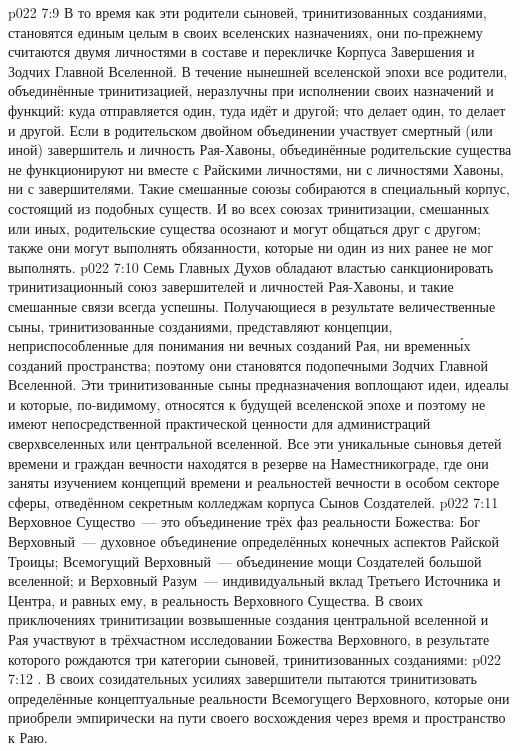 \vs p022 7:9 В то время как эти родители сыновей, тринитизованных созданиями, становятся единым целым в своих вселенских назначениях, они по\hyp{}прежнему считаются двумя личностями в составе и перекличке Корпуса Завершения и Зодчих Главной Вселенной. В течение нынешней вселенской эпохи все родители, объединённые тринитизацией, неразлучны при исполнении своих назначений и функций: куда отправляется один, туда идёт и другой; что делает один, то делает и другой. Если в родительском двойном объединении участвует смертный (или иной) завершитель и личность Рая\hyp{}Хавоны, объединённые родительские существа не функционируют ни вместе с Райскими личностями, ни с личностями Хавоны, ни с завершителями. Такие смешанные союзы собираются в специальный корпус, состоящий из подобных существ. И во всех союзах тринитизации, смешанных или иных, родительские существа осознают и могут общаться друг с другом; также они могут выполнять обязанности, которые ни один из них ранее не мог выполнять.
\vs p022 7:10 \pc Семь Главных Духов обладают властью санкционировать тринитизационный союз завершителей и личностей Рая\hyp{}Хавоны, и такие смешанные связи всегда успешны. Получающиеся в результате величественные сыны, тринитизованные созданиями, представляют концепции, неприспособленные для понимания ни вечных созданий Рая, ни временн\'ых созданий пространства; поэтому они становятся подопечными Зодчих Главной Вселенной. Эти тринитизованные сыны предназначения воплощают идеи, идеалы и  которые, по\hyp{}видимому, относятся к будущей вселенской эпохе и поэтому не имеют непосредственной практической ценности для администраций сверхвселенных или центральной вселенной. Все эти уникальные сыновья детей времени и граждан вечности находятся в резерве на Наместникограде, где они заняты изучением концепций времени и реальностей вечности в особом секторе сферы, отведённом секретным колледжам корпуса Сынов Создателей.
\vs p022 7:11 \pc Верховное Существо~--- это объединение трёх фаз реальности Божества: Бог Верховный~--- духовное объединение определённых конечных аспектов Райской Троицы; Всемогущий Верховный~--- объединение мощи Создателей большой вселенной; и Верховный Разум~--- индивидуальный вклад Третьего Источника и Центра, и равных ему, в реальность Верховного Существа. В своих приключениях тринитизации возвышенные создания центральной вселенной и Рая участвуют в трёхчастном исследовании Божества Верховного, в результате которого рождаются три категории сыновей, тринитизованных созданиями:
\vs p022 7:12 . В своих созидательных усилиях завершители пытаются тринитизовать определённые концептуальные реальности Всемогущего Верховного, которые они приобрели эмпирически на пути своего восхождения через время и пространство к Раю.
